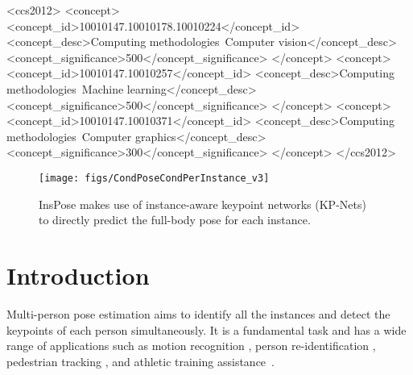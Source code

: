 \documentclass[sigconf]{acmart}
\begin{document}
\begin{CCSXML}
<ccs2012>
<concept>
<concept_id>10010147.10010178.10010224</concept_id>
<concept_desc>Computing methodologies~Computer vision</concept_desc>
<concept_significance>500</concept_significance>
</concept>
<concept>
<concept_id>10010147.10010257</concept_id>
<concept_desc>Computing methodologies~Machine learning</concept_desc>
<concept_significance>500</concept_significance>
</concept>
<concept>
<concept_id>10010147.10010371</concept_id>
<concept_desc>Computing methodologies~Computer graphics</concept_desc>
<concept_significance>300</concept_significance>
</concept>
</ccs2012>
\end{CCSXML}





\maketitle


\begin{figure}[ht]
  \centering
  \texttt{[image: figs/CondPoseCondPerInstance\_v3]}
  \vspace{-0.8cm}
  \caption{InsPose makes use of instance-aware keypoint networks (KP-Nets) to directly predict the full-body pose for each instance.
  }
  \label{fig:CondPosePerInstance}
\end{figure}


\section{Introduction}
Multi-person pose estimation aims to identify all the instances and detect the keypoints of each person simultaneously.
It is a fundamental task and has a wide range of applications such as motion recognition \cite{wang2018rgb, wang2013approach}, person re-identification \cite{li2018harmonious}, pedestrian tracking \cite{zhu2013apt}, and athletic training assistance~\cite{DBLP:conf/mm/WangQPFZ19}.
\end{document}
